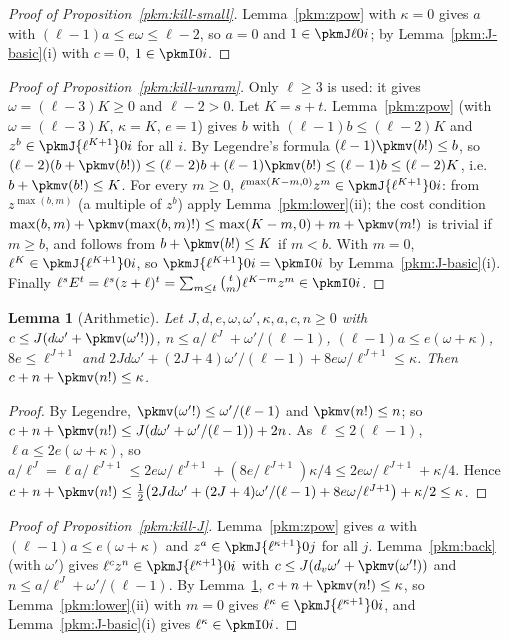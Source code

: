 \documentclass[10pt]{amsart}
\newtheorem{lemma}[theorem]{Lemma}
\theoremstyle{definition}
\theoremstyle{remark}
\begin{document}
\begin{proof}[Proof of Proposition~\ref{pkm:kill-small}]
Lemma~\ref{pkm:zpow} with $\kappa=0$ gives $a$ with $(\ell-1)a\le e\omega\le\ell-2$, so $a=0$ and
$1\in\pkmJ\ell0i$; by Lemma~\ref{pkm:J-basic}(i) with $c=0$, $1\in\pkmI0i$.
\end{proof}

\begin{proof}[Proof of Proposition~\ref{pkm:kill-unram}]
Only $\ell\ge3$ is used: it gives $\omega=(\ell-3)K\ge0$ and $\ell-2>0$. Let $K=s+t$. Lemma~\ref{pkm:zpow} (with $\omega=(\ell-3)K$, $\kappa=K$, $e=1$) gives $b$ with $(\ell-1)b\le
(\ell-2)K$ and $z^b\in\pkmJ{\ell^{K+1}}0i$ for all $i$. By Legendre's formula $(\ell-1)\pkmv(b!)\le b$, so
$(\ell-2)(b+\pkmv(b!))\le(\ell-2)b+(\ell-1)\pkmv(b!)\le(\ell-1)b\le(\ell-2)K$, i.e.\ $b+\pkmv(b!)\le K$.
For every $m\ge0$, $\ell^{\max(K-m,0)}z^m\in\pkmJ{\ell^{K+1}}0i$: from $z^{\max(b,m)}$ (a multiple of $z^b$)
apply Lemma~\ref{pkm:lower}(ii); the cost condition $\max(b,m)+\pkmv(\max(b,m)!)\le\max(K-m,0)+m+
\pkmv(m!)$ is trivial if $m\ge b$, and follows from $b+\pkmv(b!)\le K$ if $m<b$. With $m=0$,
$\ell^K\in\pkmJ{\ell^{K+1}}0i$, so $\pkmJ{\ell^{K+1}}0i=\pkmI0i$ by Lemma~\ref{pkm:J-basic}(i). Finally
$\ell^sE^t=\ell^s(z+\ell)^t=\sum_{m\le t}\binom tm\ell^{K-m}z^m\in\pkmI0i$.
\end{proof}

\begin{lemma}[Arithmetic]\label{pkm:arith}
Let $J,d,e,\omega,\omega',\kappa,a,c,n\ge0$ with $c\le J(d\omega'+\pkmv(\omega'!))$, $n\le
a/\ell^J+\omega'/(\ell-1)$, $(\ell-1)a\le e(\omega+\kappa)$, $8e\le\ell^{J+1}$ and $2Jd\omega'+
(2J+4)\omega'/(\ell-1)+8e\omega/\ell^{J+1}\le\kappa$. Then $c+n+\pkmv(n!)\le\kappa$.
\end{lemma}

\begin{proof}
By Legendre, $\pkmv(\omega'!)\le\omega'/(\ell-1)$ and $\pkmv(n!)\le n$; so $c+n+\pkmv(n!)\le
J(d\omega'+\omega'/(\ell-1))+2n$. As $\ell\le2(\ell-1)$, $\ell a\le2e(\omega+\kappa)$, so
$a/\ell^J=\ell a/\ell^{J+1}\le2e\omega/\ell^{J+1}+(8e/\ell^{J+1})\kappa/4\le2e\omega/\ell^{J+1}+\kappa/4$.
Hence $c+n+\pkmv(n!)\le\tfrac12\bigl(2Jd\omega'+(2J+4)\omega'/(\ell-1)+8e\omega/\ell^{J+1}\bigr)+
\kappa/2\le\kappa$.
\end{proof}

\begin{proof}[Proof of Proposition~\ref{pkm:kill-J}]
Lemma~\ref{pkm:zpow} gives $a$ with $(\ell-1)a\le e(\omega+\kappa)$ and $z^a\in\pkmJ{\ell^{\kappa+1}}0j$ for
all $j$. Lemma~\ref{pkm:back} (with $\omega'$) gives $\ell^cz^n\in\pkmJ{\ell^{\kappa+1}}0i$ with $c\le
J(d_v\omega'+\pkmv(\omega'!))$ and $n\le a/\ell^J+\omega'/(\ell-1)$. By Lemma~\ref{pkm:arith},
$c+n+\pkmv(n!)\le\kappa$, so Lemma~\ref{pkm:lower}(ii) with $m=0$ gives $\ell^\kappa\in\pkmJ{\ell^{\kappa+1}}0i$,
and Lemma~\ref{pkm:J-basic}(i) gives $\ell^\kappa\in\pkmI0i$.
\end{proof}
\end{document}
